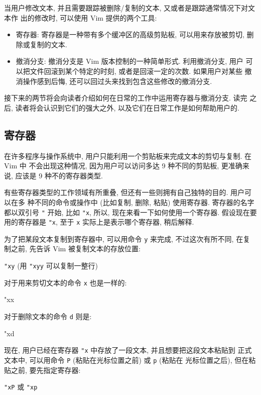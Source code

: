 当用户修改文本, 并且需要跟踪被删除/复制的文本, 又或者是跟踪通常情况下对文本作
出的修改时, 可以使用 Vim 提供的两个工具:
\begin{itemize}
    \item 寄存器: 寄存器是一种带有多个缓冲区的高级剪贴板, 可以用来存放被剪切,
        删除或复制的文本.
    \item 撤消分支: 撤消分支是 Vim 版本控制的一种简单形式. 利用撤消分支, 用户
        可以把文件回滚到某个特定的时刻, 或者是回滚一定的次数. 如果用户对某些
        撤消操作感到后悔, 还可以回过头来找到包含这些修改的撤消分支.
\end{itemize}

接下来的两节将会向读者介绍如何在日常的工作中运用寄存器与撤消分支. 读完
之后, 读者将会认识到它们的强大之外, 以及它们在日常工作是如何帮助用户的.

\subsection{寄存器}
\label{subsec:using_registers}

在许多程序与操作系统中, 用户只能利用一个剪贴板来完成文本的剪切与复制. 在 Vim 中
不会出现这种情况, 因为用户可以访问多达 9 种不同的剪贴板, 更准确来说, 应该是 9
种不的寄存器类型.

有些寄存器类型的工作领域有所重叠, 但还有一些则拥有自己独特的目的. 用户可以在多
种不同的命令或操作中 (比如复制, 删除, 粘贴) 使用寄存器. 寄存器的名字都以双引号
\texttt{"} 开始, 比如 \texttt{"x}, 所以, 现在来看一下如何使用一个寄存器.
假设现在要用的寄存器是 \texttt{"x}, 至于 \texttt{x} 实际上是表示哪个寄存器,
稍后解释.

为了把某段文本复制到寄存器中, 可以用命令 \texttt{y} 来完成, 不过这次有所不同,
在复制之前, 先告诉 Vim 被复制文本的存放位置:
\begin{vimcmdform}
\texttt{"xy} (用 \texttt{"xyy} 可以复制一整行)
\end{vimcmdform}
对于用来剪切文本的命令 \texttt{x} 也是一样的:
\begin{vimcode}
"xx
\end{vimcode}
对于删除文本的命令 \texttt{d} 则是:
\begin{vimcode}
"xd
\end{vimcode}

现在, 用户已经在寄存器 \texttt{"x} 中存放了一段文本, 并且想要把这段文本粘贴到
正式文本中, 可以用命令 \texttt{P} (粘贴在光标位置之前) 或 \texttt{p} (粘贴在
光标位置之后), 但在粘贴之前, 要先指定寄存器:
\begin{vimcmdform}
\texttt{"xP} 或 \texttt{"xp}
\end{vimcmdform}

